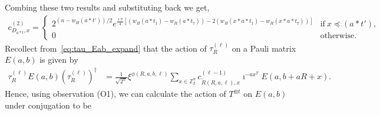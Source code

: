 \documentclass[twoside,romanappendices]{IEEEtran}
\begin{document}
Combing these two results and substituting back we get,
\begin{align}
c_{D_{a \ast t},x}^{(2)} = 
\begin{cases}
2^{\left( n - w_H(a \ast t') \right)/2} e^{\frac{\imath\pi}{4} \left[ \left( w_H(a \ast t_1) - w_H(a \ast t_7) \right) - 2 \left( w_H(x \ast a \ast t_1) - w_H(x \ast a \ast t_7) \right) \right]}  & \text{if}\ x \preceq (a \ast t'), \\
0 & \text{otherwise}.
\end{cases}
\end{align}
Recollect from~\eqref{eq:tau_Eab_expand} that the action of $\tau_R^{(\ell)}$ on a Pauli matrix $E(a,b)$ is given by
\begin{align}
\tau_R^{(\ell)} E(a,b) ( \tau_R^{(\ell)} )^{\dagger} & = \frac{1}{\sqrt{2^n}} \xi^{\phi(R,a,b,\ell)} \sum_{x \in \mathbb{Z}_2^n} c_{\tilde{R}(R,a,\ell),x}^{(\ell-1)} \imath^{-ax^T} E(a, b + aR + x).
\end{align}
Hence, using observation (O1), we can calculate the action of $T^{\otimes t}$ on $E(a,b)$ under conjugation to be
\end{document}
